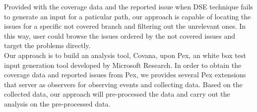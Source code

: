 Provided with the coverage data and the reported issue when DSE technique fails to generate an input for a paticular path, our approach is capable of locating the issues for a specific not covered branch and filtering out the unrelevant ones. In this way, user could browse the issues ordered by the not covered issues and target the problems directly. 
\\Our approach is to build an analysis tool, Covana, upon Pex, an white box test input generation tool developed by Microsoft Research. In order to obtain the coverage data and reported issues from Pex, we provides several Pex extensions that server as observers for observing events and collecting data. Based on the collected data, our approach will pre-processed the data and carry out the analysis on the pre-processed data. 


 

